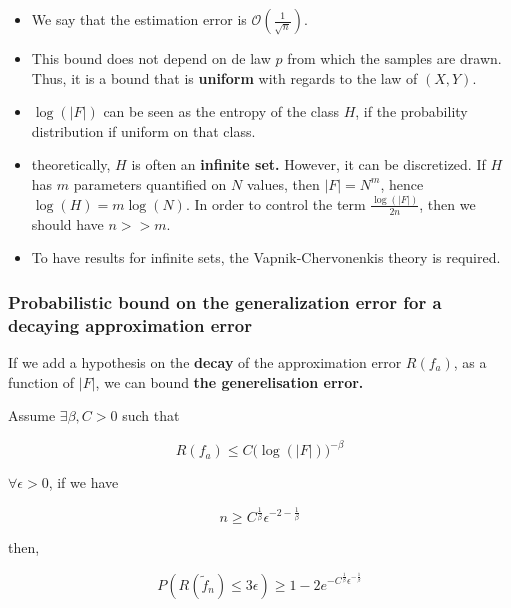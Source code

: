 \documentclass[
10pt, %
a4paper, %
oneside, %
headinclude,footinclude, %
BCOR5mm, %
]{scrartcl}
\begin{document}
    \begin{remark}
	\begin{itemize}
	    \item We say that the estimation error is $ \mathcal{O} ( \frac{1}{ \sqrt{n} } )$.
	    \item This bound does not depend on de law $p$ from which the samples are drawn. Thus, it is a bound that is \textbf{{uniform}} with regards to the law of $ (X,Y)$.
	    \item $\log(|F|)$ can be seen as the entropy of the class $H$, if the probability distribution if uniform on that class.
	    \item theoretically, $H$ is often an \textbf{{infinite set.}} However, it can be discretized. If $H$ has $m$ parameters quantified on $N$ values, then $ |F| = N^m$, hence $\log(H)=m\log(N)$. In order to control the term $ \frac{\log(|F|)}{2n} $, then we should have $ n >> m$.
	    \item To have results for infinite sets, the Vapnik-Chervonenkis theory is required.
	\end{itemize}
    \end{remark}

    \subsubsection{\large\color{Periwinkle}Probabilistic bound on the generalization error for a decaying approximation error}

    If we add a hypothesis on the \textbf{{decay}} of the approximation error $ R(f_a)$, as a function of $|F|$, we can bound \textbf{{the generelisation error.}} 

    \begin{proposition}
	\label{prop:decay_approx}

	Assume $\exists \beta , C >0$ such that

	\begin{equation}
	    \label{eq:decay}
	    R(f_a)\leq C\big( \log(|F|) \big)^{-\beta}
	\end{equation}

	$\forall \epsilon >0$, if we have

	\begin{equation*}
	    n\geq C^{ \frac{1}{ \beta} } \epsilon^{-2- \frac{1}{\beta} }
	\end{equation*}

	then,

	\begin{equation*}
	    P(R( \tilde{f}_n)\leq 3\epsilon)\geq 1-2e^{ - C^{ \frac{1}{\beta} }\epsilon^{- \frac{1}{\beta} }}
	\end{equation*}
        
    \end{proposition}
\end{document}
